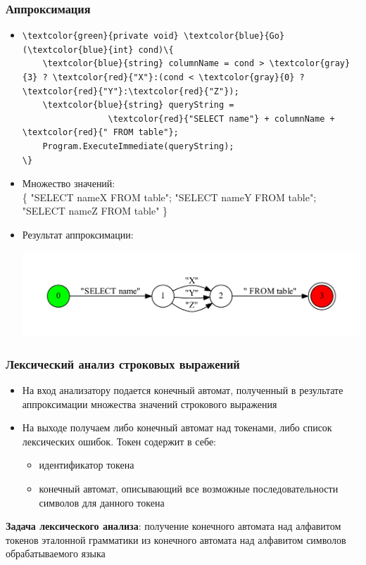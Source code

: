 \documentclass{beamer}
\begin{document}
\begin{frame}[fragile]
\transwipe[direction=90]
\frametitle{Аппроксимация}
\begin{itemize}
\item 
\begin{Verbatim}[commandchars=\\\{\}]
\textcolor{green}{private void} \textcolor{blue}{Go} (\textcolor{blue}{int} cond)\{
	\textcolor{blue}{string} columnName = cond > \textcolor{gray}{3} ? \textcolor{red}{"X"}:(cond < \textcolor{gray}{0} ? \textcolor{red}{"Y"}:\textcolor{red}{"Z"});
	\textcolor{blue}{string} queryString = 
	             \textcolor{red}{"SELECT name"} + columnName + \textcolor{red}{" FROM table"};
	Program.ExecuteImmediate(queryString);
\}
\end{Verbatim}

\item Множество значений:\\ 		
\{ "SELECT nameX FROM table"; "SELECT nameY FROM table"; "SELECT nameZ FROM table" \}

		
\item Результат аппроксимации:
\begin{center}
	{\includegraphics[width=1.0\linewidth]{tsql_test}}
\end{center}

\end{itemize}
\end{frame}


\begin{frame}
\transwipe[direction=90]
\frametitle{Лексический анализ строковых выражений}
\begin{itemize}
\item На вход анализатору подается конечный автомат, полученный в результате аппроксимации множества значений строкового выражения
\item На выходе получаем либо конечный автомат над токенами, либо список лексических ошибок. Токен содержит в себе:
	\begin{itemize}
	\item идентификатор токена
	\item конечный автомат, описывающий все возможные последовательности символов для данного токена
	\end{itemize}
\end{itemize}

\begin{block}{}
\textbf{Задача лексического анализа}: получение конечного автомата над алфавитом токенов эталонной грамматики из конечного автомата над алфавитом символов обрабатываемого языка
\end{block}

\end{frame}
\end{document}
